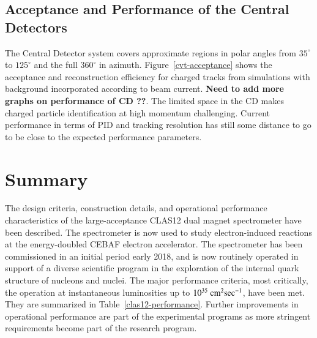 \documentclass[final,3p,twocolumn]{elsarticle}
\begin{document}
\subsection{Acceptance and Performance of the Central Detectors} 

The Central Detector system covers approximate regions in polar angles from $35^\circ$ to $125^\circ$ and the full
$360^\circ$ in azimuth.  Figure~\ref{cvt-acceptance} shows the acceptance and reconstruction efficiency for charged
tracks from simulations with background incorporated according to beam current. {\bf Need to add more graphs on
performance of CD ??}. The limited space in the CD makes charged particle identification at high momentum challenging.
Current performance in terms of PID and tracking resolution has still some distance to go to be close to the expected
performance parameters.   

\section{Summary} 

The design criteria, construction details, and operational performance characteristics of the large-acceptance CLAS12
dual magnet spectrometer have been described. The spectrometer is now used to study electron-induced reactions at
the energy-doubled CEBAF electron accelerator. The spectrometer has been commissioned in an initial period early 2018,
and is now routinely operated in support of a diverse scientific program in the exploration of the internal quark structure
of nucleons and nuclei. The major performance criteria, most critically, the operation at  instantaneous luminosities up to 
$10^{35}\rm~{cm^2}\rm{sec^{-1}}$, have been met. They are summarized in Table~\ref{clas12-performance}. Further
improvements in operational performance are part of the experimental programs as more stringent requirements become
part of the research program.  

\vspace{0,5cm}


\vspace{0.3cm}
\end{document}
